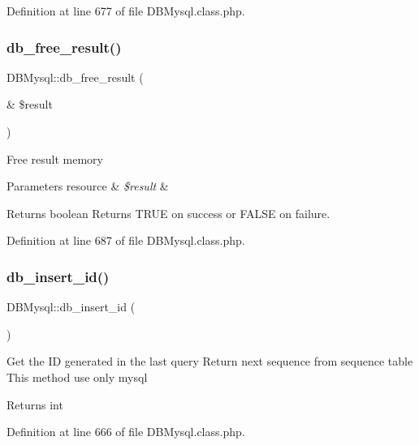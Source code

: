 Definition at line 677 of file D\+B\+Mysql.\+class.\+php.

\mbox{\label{classDBMysql_a0d907e935bcfafa845fd39640dcc60cf}} 
\subsubsection{\texorpdfstring{db\+\_\+free\+\_\+result()}{db\_free\_result()}}
{\footnotesize\ttfamily D\+B\+Mysql\+::db\+\_\+free\+\_\+result (\begin{DoxyParamCaption}\item[{\&}]{\$result }\end{DoxyParamCaption})}

Free result memory 
\begin{DoxyParams}[1]{Parameters}
resource & {\em \$result} & \\
\hline
\end{DoxyParams}
\begin{DoxyReturn}{Returns}
boolean Returns T\+R\+UE on success or F\+A\+L\+SE on failure. 
\end{DoxyReturn}


Definition at line 687 of file D\+B\+Mysql.\+class.\+php.

\mbox{\label{classDBMysql_a21acddd922e39574922f60b881add658}} 
\subsubsection{\texorpdfstring{db\+\_\+insert\+\_\+id()}{db\_insert\_id()}}
{\footnotesize\ttfamily D\+B\+Mysql\+::db\+\_\+insert\+\_\+id (\begin{DoxyParamCaption}{ }\end{DoxyParamCaption})}

Get the ID generated in the last query Return next sequence from sequence table This method use only mysql \begin{DoxyReturn}{Returns}
int 
\end{DoxyReturn}


Definition at line 666 of file D\+B\+Mysql.\+class.\+php.

